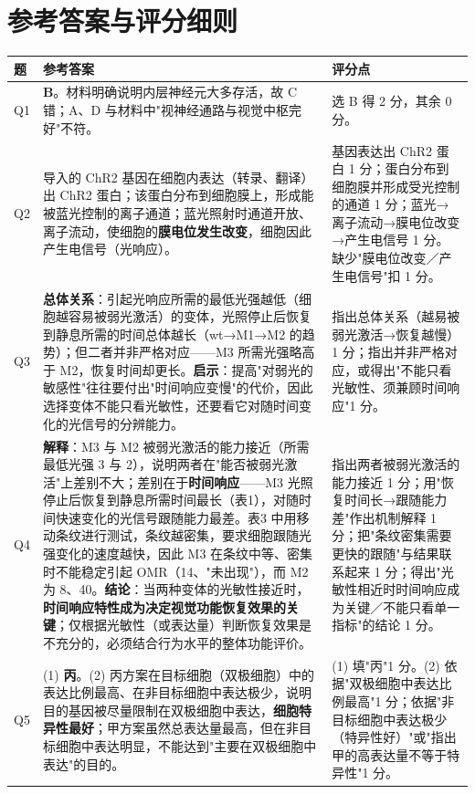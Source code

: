 \documentclass[UTF8,a4paper,11pt]{ctexart}
\begin{document}
\clearpage
\section{参考答案与评分细则}

\begin{longtable}{@{}p{0.9cm}p{9.6cm}p{4.2cm}@{}}
\toprule
\textbf{题} & \textbf{参考答案} & \textbf{评分点} \\
\midrule
\endhead
Q1 & \textbf{B}。材料明确说明内层神经元大多存活，故 C 错；A、D 与材料中"视神经通路与视觉中枢完好"不符。 & 选 B 得 2 分，其余 0 分。 \\
\addlinespace
Q2 & 导入的 ChR2 基因在细胞内表达（转录、翻译）出 ChR2 蛋白；该蛋白分布到细胞膜上，形成能被蓝光控制的离子通道；蓝光照射时通道开放、离子流动，使细胞的\textbf{膜电位发生改变}，细胞因此产生电信号（光响应）。 & 基因表达出 ChR2 蛋白 1 分；蛋白分布到细胞膜并形成受光控制的通道 1 分；蓝光→离子流动→膜电位改变→产生电信号 1 分。缺少"膜电位改变／产生电信号"扣 1 分。 \\
\addlinespace
Q3 & \textbf{总体关系}：引起光响应所需的最低光强越低（细胞越容易被弱光激活）的变体，光照停止后恢复到静息所需的时间总体越长（wt→M1→M2 的趋势）；但二者并非严格对应——M3 所需光强略高于 M2，恢复时间却更长。\textbf{启示}：提高"对弱光的敏感性"往往要付出"时间响应变慢"的代价，因此选择变体不能只看光敏性，还要看它对随时间变化的光信号的分辨能力。 & 指出总体关系（越易被弱光激活→恢复越慢）1 分；指出并非严格对应，或得出"不能只看光敏性、须兼顾时间响应"1 分。 \\
\addlinespace
Q4 & \textbf{解释}：M3 与 M2 被弱光激活的能力接近（所需最低光强 3 与 2），说明两者在"能否被弱光激活"上差别不大；差别在于\textbf{时间响应}——M3 光照停止后恢复到静息所需时间最长（表1），对随时间快速变化的光信号跟随能力最差。表3 中用移动条纹进行测试，条纹越密集，要求细胞跟随光强变化的速度越快，因此 M3 在条纹中等、密集时不能稳定引起 OMR（14、"未出现"），而 M2 为 8、40。\textbf{结论}：当两种变体的光敏性接近时，\textbf{时间响应特性成为决定视觉功能恢复效果的关键}；仅根据光敏性（或表达量）判断恢复效果是不充分的，必须结合行为水平的整体功能评价。 & 指出两者被弱光激活的能力接近 1 分；用"恢复时间长→跟随能力差"作出机制解释 1 分；把"条纹密集需要更快的跟随"与结果联系起来 1 分；得出"光敏性相近时时间响应成为关键／不能只看单一指标"的结论 1 分。 \\
\addlinespace
Q5 & (1) \textbf{丙}。(2) 丙方案在目标细胞（双极细胞）中的表达比例最高、在非目标细胞中表达极少，说明目的基因被尽量限制在双极细胞中表达，\textbf{细胞特异性最好}；甲方案虽然总表达量最高，但在非目标细胞中表达明显，不能达到"主要在双极细胞中表达"的目的。 & (1) 填"丙"1 分。(2) 依据"双极细胞中表达比例最高"1 分；依据"非目标细胞中表达极少（特异性好）"或"指出甲的高表达量不等于特异性"1 分。 \\

\end{longtable}
\end{document}
